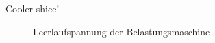 
\chapter{}\label{ch:auf1}

\section{}\label{sec:1a}
%
Cooler shice!

\begin{figure}[htb]
	\centering
	
	\caption{Leerlaufspannung der Belastungsmaschine}
\end{figure}







